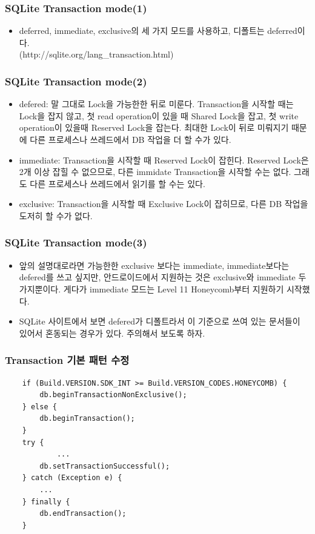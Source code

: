 \documentclass{beamer}
\begin{document}
\begin{frame}
\frametitle{SQLite Transaction mode(1)}
\begin{itemize}
\item deferred, immediate, exclusive의 세 가지 모드를 사용하고, 디폴트는 deferred이다.\\(http://sqlite.org/lang\_transaction.html)
\end{itemize}
\end{frame}

\begin{frame}
\frametitle{SQLite Transaction mode(2)}
\begin{itemize}
\item defered: 말 그대로 Lock을 가능한한 뒤로 미룬다. Transaction을 시작할 때는 Lock을 잡지 않고, 첫 read operation이 있을 때 Shared Lock을 잡고, 첫 write operation이 있을때 Reserved Lock을 잡는다. 최대한 Lock이 뒤로 미뤄지기 때문에 다른 프로세스나 쓰레드에서 DB 작업을 더 할 수가 있다. 
\item immediate: Transaction을 시작할 때 Reserved Lock이 잡힌다. Reserved Lock은 2개 이상 잡힐 수 없으므로, 다른 immidate Transaction을 시작할 수는 없다. 그래도 다른 프로세스나 쓰레드에서 읽기를 할 수는 있다.
\item exclusive: Transaction을 시작할 때 Exclusive Lock이 잡히므로, 다른 DB 작업을 도저히 할 수가 없다.
\end{itemize}
\end{frame}

\begin{frame}
\frametitle{SQLite Transaction mode(3)}
\begin{itemize}
\item 앞의 설명대로라면 가능한한 exclusive 보다는 immediate, immediate보다는 defered를 쓰고 싶지만, 안드로이드에서 지원하는 것은 exclusive와 immediate 두 가지뿐이다. 게다가 immediate 모드는 Level 11 Honeycomb부터 지원하기 시작했다.\\
\item SQLite 사이트에서 보면 defered가 디폴트라서 이 기준으로 쓰여 있는 문서들이 있어서 혼동되는 경우가 있다. 주의해서 보도록 하자.
\end{itemize}
\end{frame}

\begin{frame}[fragile]
\frametitle{Transaction 기본 패턴 수정}
\begin{verbatim}
	if (Build.VERSION.SDK_INT >= Build.VERSION_CODES.HONEYCOMB) {
	    db.beginTransactionNonExclusive();
	} else {
	    db.beginTransaction();
	}
	try {
	    	...
	    db.setTransactionSuccessful();
	} catch (Exception e) {
	    ...
	} finally {
	    db.endTransaction();
	}
\end{verbatim}
\end{frame}
\end{document}
